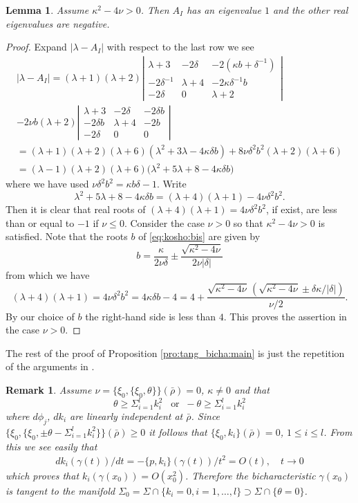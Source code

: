 \documentclass[12pt,leqno]{article} %
\def\ga{\gamma}
\def\la{\lambda}
\def\bro{\bar\rho}
\def\bro{\bar\rho}
\numberwithin{equation}{section}
\newtheorem{remark}{Remark}[section]
\newtheorem{lem}{Lemma}[section]
\begin{document}
%
\begin{lem}
\label{lem:koyuti} Assume $\kappa^2-4\nu> 0$. Then
$A_I$ has an eigenvalue $1$ and the other real eigenvalues are negative.
%
\end{lem}
%
\begin{proof} 
Expand $|\la-A_I|$ with respect to the last row we see
%
\begin{gather*}
|\la-A_I|=(\la+1)(\la+2)\left|\begin{array}{ccc}
\la+3&-2\delta&-2(\kappa b+\delta^{-1})\\
-2\delta^{-1}&\la+4&-2\kappa\delta^{-1}b\\
-2\delta&0&\la+2
\end{array}\right|\\
-2 \nu b (\la+2)\left|
\begin{array}{ccc}
\la+3&-2\delta&-2\delta b\\
-2\delta b&\la+4&-2b\\
-2\delta&0&0
\end{array}\right|\\
=(\la+1)(\la+2)(\la+6)(\la^2+3\la-4\kappa \delta b)+8\nu \delta^2 b^2(\la+2)(\la+6)\\
=(\la-1)(\la+2)(\la+6)\big(\la^2+5\la+8-4\kappa\delta b\big)
\end{gather*}
%
where we have used $\nu \delta^2 b^2=\kappa b\delta-1$.
Write
%
\[
\la^2+5\la+8-4\kappa\delta b=(\la+4)(\la+1)-4\nu\delta^2b^2.
\]
%
Then it is clear that real roots of $(\la+4)(\la+1)=4\nu\delta^2b^2$, if exist, are less than or equal to $-1$ if $\nu\leq 0$. Consider the case $\nu>0$ so that $\kappa^2-4\nu> 0$  is satisfied. Note that the roots  $b$ of \eqref{eq:kosho:bis} are given by
%
\[
b=\frac{\kappa}{2\nu\delta}\pm \frac{\sqrt{\kappa^2-4\nu}}{2\nu|\delta|}
\]
%
from which we have
%
\[
(\la+4)(\la+1)=4\nu\delta^2b^2=4\kappa\delta b-4=4+\frac{\sqrt{\kappa^2-4\nu}\,(\sqrt{\kappa^2-4\nu}\pm \delta \kappa/|\delta|)}{\nu/2}.
\]
%
%
By our choice of $b$ the right-hand side is less than $4$. This proves the assertion in the case $\nu>0$. 
\end{proof}
%
The rest of the proof of Proposition \ref{pro:tang_bicha:main} is just the repetition of the arguments in \cite[Sections 3.3 and 3.4]{MR3726883}. 
%
\begin{remark}
\label{rem:a}\rm Assume $\nu=\{\xi_0,\{\xi_0,\theta\}\}(\bro)=0$, $\kappa\neq 0$ and that
%
\[
\theta\geq \Sigma_{i=1}^lk_i^2\;\; \;\text{or}\;\;-\theta\geq \Sigma_{i=1}^lk_i^2
\]
%
where $d\phi_j$, $dk_i$ are linearly independent at $\bro$. Since $\{\xi_0,\{\xi_0,\pm\theta-\Sigma_{i=1}^lk_i^2\}\}(\bro)\geq 0$ it follows that $\{\xi_0,k_i\}(\bro)=0$, $1\leq i\leq l$. From this we see easily that
%
\begin{gather*}
dk_i(\ga(t))/dt=-\{p,k_i\}(\ga(t))/t^2=O(t),\quad t\to 0
\end{gather*}
%
which proves that $k_i(\ga(x_0))=O(x_0^2)$.
%
%
Therefore the bicharacteristic $\ga(x_0)$ is tangent to the manifold $\Sigma_0=\Sigma\cap\{k_i=0, i=1,\ldots,l\}\supset \Sigma\cap\{\theta=0\}$.
\end{remark}
\end{document}
